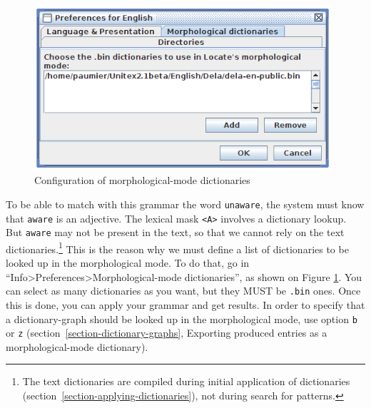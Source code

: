\begin{figure}[!ht]
\begin{center}
\includegraphics[width=11cm]{resources/img/fig6-17n.png}
\caption{Configuration of morphological-mode dictionaries\label{fig-morpho4}}
\end{center}
\end{figure}

\bigskip
\noindent To be able to match with this grammar the word 
\verb+unaware+, the system must know that \verb+aware+ is an adjective.
The lexical mask \verb+<A>+ involves a dictionary lookup. But
\verb+aware+ may not be present in the text, so that we cannot rely on the text
dictionaries.\footnote{The text dictionaries are compiled during initial application of
dictionaries (section~\ref{section-applying-dictionaries}), not during search for patterns.}
 This is the reason why we must define a list of dictionaries
to be looked up in the morphological mode. To do that, go in
``Info>Preferences>Morphological-mode dictionaries'', as shown on Figure
\ref{fig-morpho4}. You can select as many dictionaries as you want, but they
MUST be \verb+.bin+ ones. Once this is done, you can apply your grammar and get results.
In order to specify that a dictionary-graph should be looked up in the morphological mode,
use option \verb+b+ or \verb+z+ (section~\ref{section-dictionary-graphs}, Exporting produced entries
as a morphological-mode dictionary).

